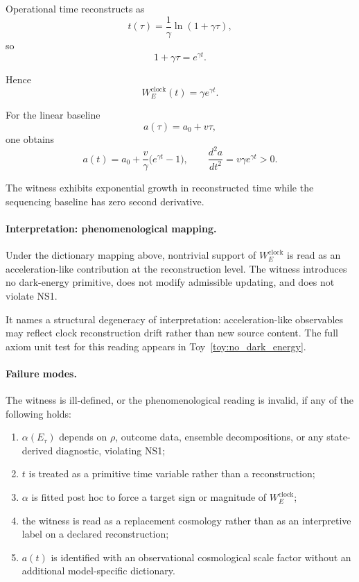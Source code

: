 \documentclass[aps,prx,onecolumn,11pt]{revtex4-2}
\theoremstyle{plain}
\theoremstyle{definition}
\theoremstyle{remark}
\begin{document}
Operational time reconstructs as
\[
t(\tau)
=
\frac{1}{\gamma}\ln(1+\gamma\tau),
\]
so
\[
1+\gamma\tau
=
e^{\gamma t}.
\]

Hence
\begin{equation}
W^{\mathrm{clock}}_E(t)
=
\gamma e^{\gamma t}.
\label{eq:clock_drift_log_witness_t}
\end{equation}

For the linear baseline
\[
a(\tau)=a_0+v\tau,
\]
one obtains
\begin{equation}
a(t)
=
a_0+\frac{v}{\gamma}\bigl(e^{\gamma t}-1\bigr),
\qquad
\frac{d^2a}{dt^2}
=
v\gamma e^{\gamma t}
>
0.
\label{eq:clock_drift_log_accel}
\end{equation}

The witness exhibits exponential growth in reconstructed time while the
sequencing baseline has zero second derivative.

\paragraph{Interpretation: phenomenological mapping.}

Under the dictionary mapping above, nontrivial support of
\(W^{\mathrm{clock}}_E\) is read as an acceleration-like contribution
at the reconstruction level. The witness introduces no dark-energy
primitive, does not modify admissible updating, and does not violate
NS1.

It names a structural degeneracy of interpretation: acceleration-like
observables may reflect clock reconstruction drift rather than new
source content. The full axiom unit test for this reading appears in
Toy~\ref{toy:no_dark_energy}.

\paragraph{Failure modes.}

The witness is ill-defined, or the phenomenological reading is invalid,
if any of the following holds:

\begin{enumerate}[label=(\roman*), leftmargin=2.2em]
\item \(\alpha(E_\tau)\) depends on \(\rho\), outcome data, ensemble
decompositions, or any state-derived diagnostic, violating NS1;

\item \(t\) is treated as a primitive time variable rather than a
reconstruction;

\item \(\alpha\) is fitted post hoc to force a target sign or magnitude
of \(W^{\mathrm{clock}}_E\);

\item the witness is read as a replacement cosmology rather than as an
interpretive label on a declared reconstruction;

\item \(a(t)\) is identified with an observational cosmological scale
factor without an additional model-specific dictionary.
\end{enumerate}
\end{document}
